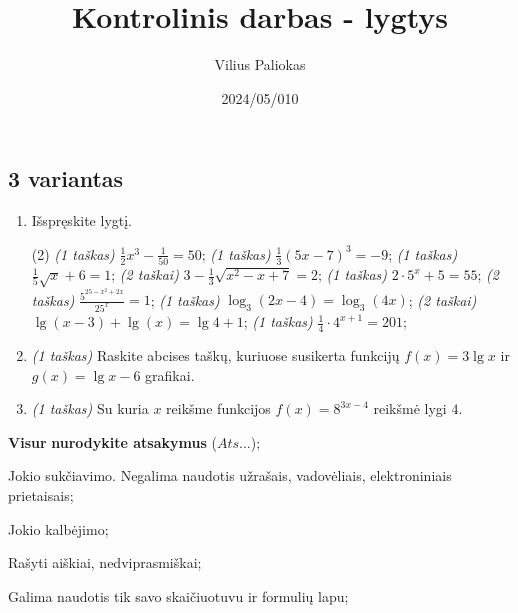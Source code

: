 \documentclass[a4paper]{article}
\title{Kontrolinis darbas - lygtys}
\author{Vilius Paliokas}
\date{2024/05/010}
\begin{document}
\thispagestyle{fancy}

\titlespacing*{\subsection}{0pt}{.75ex}{0.75ex}

\subsection*{3 variantas}

\begin{enumerate}
      \item Išspręskite lygtį.
            \begin{tasks}[item-format={\normalfont}, after-item-skip=2mm](2)
                  \task \textit{(1 taškas)} $\frac{1}{2}x^3-\frac{1}{50}=50$;
                  \task \textit{(1 taškas)} $\frac{1}{3}(5x-7)^3=-9$;
                  \task \textit{(1 taškas)} $\frac{1}{5}\sqrt{x}+6=1$;
                  \task \textit{(2 taškai)} $3-\frac{1}{3}\sqrt{x^2-x+7}=2$;
                  \task \textit{(1 taškas)} $2\cdot5^x+5=55$;
                  \task \textit{(2 taškas)} $\frac{5^{25-x^2+2x}}{25^x}=1$;
                  \task \textit{(1 taškas)} $\log_3(2x-4)=\log_3(4x)$;
                  \task \textit{(2 taškai)} $\lg(x-3)+\lg(x)=\lg4+1$;
                  \task \textit{(1 taškas)} $\frac{1}{4}\cdot 4^{x+1}=201$;
            \end{tasks}
      \item \textit{(1 taškas)} Raskite abcises taškų, kuriuose susikerta funkcijų $f(x)=3\lg{x}$ ir $g(x)=\lg{x}-6$ grafikai.
      \item \textit{(1 taškas)} Su kuria $x$ reikšme funkcijos $f(x)=8^{3x-4}$ reikšmė lygi $4$.
\end{enumerate}

\begin{small}
      \begin{enumerate*}[label={(\arabic*)}]
            \item \textbf{Visur} \textbf{nurodykite atsakymus} ($Ats\ldots$);
            \item Jokio sukčiavimo. Negalima naudotis užrašais, vadovėliais,
            elektroniniais prietaisais;
            \item Jokio kalbėjimo;
            \item Rašyti aiškiai, nedviprasmiškai;
            \item Galima naudotis tik savo skaičiuotuvu ir formulių lapu;
      \end{enumerate*}
\end{small}
\end{document}
